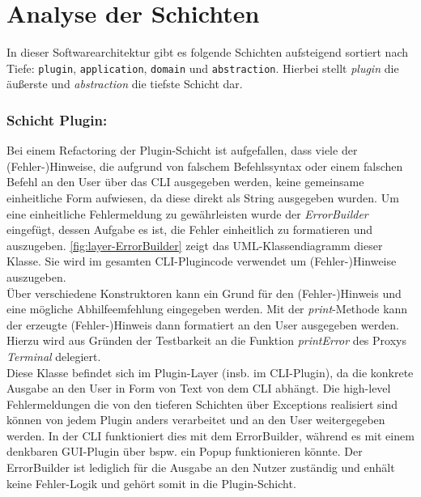 \section{Analyse der Schichten} \label{sec:clean_arch:layers}

In dieser Softwarearchitektur gibt es folgende Schichten aufsteigend sortiert nach Tiefe: 
\texttt{plugin}, \texttt{application}, \texttt{domain} und \texttt{abstraction}.
Hierbei stellt \textit{plugin} die äußerste und \textit{abstraction} die tiefste Schicht dar. 

\subsubsection{Schicht Plugin:}

Bei einem Refactoring der Plugin-Schicht ist aufgefallen, dass viele der (Fehler-)Hinweise, 
die aufgrund von falschem Befehlssyntax oder einem falschen Befehl an den User über das CLI ausgegeben werden, 
keine gemeinsame einheitliche Form aufwiesen, da diese direkt als String ausgegeben wurden. 
Um eine einheitliche Fehlermeldung zu gewährleisten wurde der \textit{ErrorBuilder} eingefügt, 
dessen Aufgabe es ist, die Fehler einheitlich zu formatieren und auszugeben. \autoref{fig:layer-ErrorBuilder} 
zeigt das UML-Klassendiagramm dieser Klasse. Sie wird im gesamten CLI-Plugincode verwendet um (Fehler-)Hinweise 
auszugeben. \\
Über verschiedene Konstruktoren kann ein Grund für den (Fehler-)Hinweis und eine mögliche Abhilfeemfehlung 
eingegeben werden.
Mit der \textit{print}-Methode kann der erzeugte (Fehler-)Hinweis dann formatiert an den User ausgegeben werden. 
Hierzu wird aus Gründen der Testbarkeit an die Funktion \textit{printError} des Proxys \textit{Terminal} delegiert. \\
Diese Klasse befindet sich im Plugin-Layer (insb. im CLI-Plugin), da die konkrete Ausgabe an den User 
in Form von Text von dem CLI abhängt. Die high-level Fehlermeldungen die von den tieferen Schichten über 
Exceptions realisiert sind können von jedem Plugin anders verarbeitet und an den User weitergegeben werden. 
In der CLI funktioniert dies mit dem ErrorBuilder, während es mit einem denkbaren GUI-Plugin über bspw. 
ein Popup funktionieren könnte. Der ErrorBuilder ist lediglich für die Ausgabe an den Nutzer zuständig 
und enhält keine Fehler-Logik und gehört somit in die Plugin-Schicht. 


